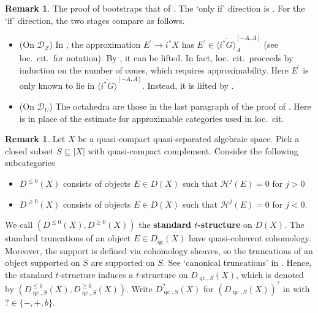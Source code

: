 \documentclass[11pt]{amsart}
\theoremstyle{plain}
\theoremstyle{definition}
\newtheorem{remark}[theorem]{Remark}
\numberwithin{equation}{section}
\numberwithin{theorem}{section}
\begin{document}
\begin{remark}
    The proof of  bootstraps that of \cite[Theorem 5.1]{Burke/Neeman/Pauwels:2023}.
    The `only if' direction is \cite[Remark 3]{Burke/Neeman/Pauwels:2023}.
    For the `if' direction, the two stages compare as follows.
    \begin{itemize}
        \item (On $\mathcal{D}_Z$) In \cite{Burke/Neeman/Pauwels:2023}, the approximation $E^\prime \to i^\ast X$ has $E^\prime \in \overline{\langle i^\ast G\rangle}^{[-A,A]}_A$ (see loc.\ cit.\ for notation). 
        By \cite[Lemma 5.5]{Burke/Neeman/Pauwels:2023}, it can be lifted.
        In fact, loc.\ cit.\ proceeds by induction on the number of cones, which requires approximability.
        Here $E^\prime$ is only known to lie in $\overline{\langle i^\ast G\rangle}^{[-A,A]}$.
        Instead, it is lifted by .
        \item (On $\mathcal{D}_U$) The octahedra are those in the last paragraph of the proof of \cite[Theorem 5.1]{Burke/Neeman/Pauwels:2023}.
        Here  is in place of the estimate for approximable categories used in loc.\ cit.\
    \end{itemize}
\end{remark}

\begin{remark}
    Let $X$ be a quasi-compact quasi-separated algebraic space. 
    Pick a closed subset $S\subseteq |X|$ with quasi-compact complement. 
    Consider the following subcategories
    \begin{itemize}
        \item $D^{\leq 0}(X)$ consists of objects $E\in D(X)$ such that $\mathcal{H}^j (E)=0$ for $j >0$
        \item $D^{\geq 0}(X)$ consists of objects $E\in D(X)$ such that $\mathcal{H}^j (E)=0$ for $j <0$. 
    \end{itemize}
    We call $(D^{\leq 0}(X), D^{\geq 0}(X))$ the \textbf{standard $t$-structure} on $D(X)$. 
    The standard truncations of an object $E\in D_{\operatorname{qc}}(X)$ have quasi-coherent cohomology.
    Moreover, the support is defined via cohomology sheaves, so the truncations of an object supported on $S$ are supported on $S$.
    See `canonical truncations' in \cite[\href{https://stacks.math.columbia.edu/tag/0118}{Tag 0118}]{StacksProject}.
    Hence, the standard $t$-structure induces a $t$-structure on $D_{\operatorname{qc},S}(X)$, which is denoted by $(D^{\leq 0}_{\operatorname{qc},S}(X), D^{\geq 0}_{\operatorname{qc},S}(X))$.
    Write $D^?_{\operatorname{qc},S}(X)$ for $(D_{\operatorname{qc},S}(X))^?$ in \Cref{sec:prelim_t-structures_t_structures} with $?\in \{-,+,b\}$. 
\end{remark}
\end{document}
